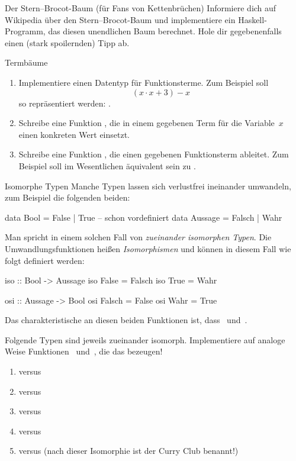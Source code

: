 \documentclass{uebblatt}
\begin{document}
\begin{aufgabe}{Der Stern--Brocot-Baum (für Fans von Kettenbrüchen)}
Informiere dich auf Wikipedia über den Stern--Brocot-Baum und implementiere ein
Haskell-Programm, das diesen unendlichen Baum berechnet. Hole dir
gegebenenfalls einen (stark spoilernden) Tipp ab.
\end{aufgabe}

\begin{aufgabe}{Termbäume}
\begin{enumerate}
\item Implementiere einen Datentyp für Funktionsterme. Zum Beispiel soll
\[ (x \cdot x + 3) - x \]
so repräsentiert werden: .
\item Schreibe eine Funktion ,
die in einem gegebenen Term für die Variable~$x$ einen konkreten Wert einsetzt.
\item Schreibe eine Funktion , die
einen gegebenen Funktionsterm ableitet. Zum Beispiel soll  im Wesentlichen äquivalent sein zu .
\end{enumerate}
\end{aufgabe}

\begin{aufgabe}{Isomorphe Typen}
Manche Typen lassen sich verlustfrei ineinander umwandeln, zum Beispiel die
folgenden beiden:
\begin{haskellcode}
data Bool    = False  | True  -- schon vordefiniert
data Aussage = Falsch | Wahr
\end{haskellcode}
Man spricht in einem solchen Fall von \emph{zueinander isomorphen Typen}. Die
Umwandlungsfunktionen heißen \emph{Isomorphismen} und können in diesem Fall wie
folgt definiert werden:
\begin{haskellcode}
iso :: Bool -> Aussage
iso False = Falsch
iso True  = Wahr

osi :: Aussage -> Bool
osi Falsch = False
osi Wahr   = True
\end{haskellcode}
Das charakteristische an diesen beiden Funktionen ist, dass~ und~.

Folgende Typen sind jeweils zueinander isomorph. Implementiere
auf analoge Weise Funktionen~ und~, die
das bezeugen!
\begin{enumerate}
\item {}          versus 
\item {}     versus 
\item {} versus 
\item {}     versus 
\item {}     versus 
(nach dieser Isomorphie ist der Curry Club benannt!)
\end{enumerate}
\end{aufgabe}
\end{document}
